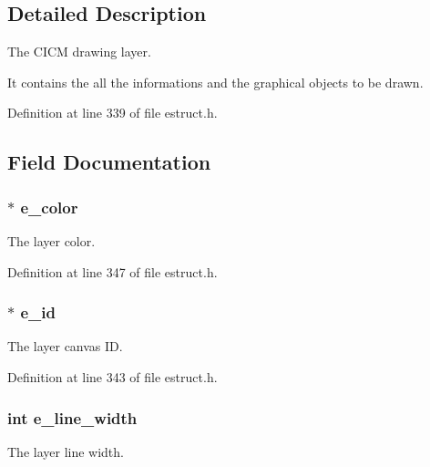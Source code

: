 \subsection{Detailed Description}
The C\-I\-C\-M drawing layer. 

It contains the all the informations and the graphical objects to be drawn. 

Definition at line 339 of file estruct.\-h.



\subsection{Field Documentation}
\hypertarget{struct__elayer_a13dfb00aea95e0dc5b9d1297260a9280}{
\subsubsection[{e\-\_\-color}]{$\ast$ e\-\_\-color}}\label{struct__elayer_a13dfb00aea95e0dc5b9d1297260a9280}
The layer color. 

Definition at line 347 of file estruct.\-h.

\hypertarget{struct__elayer_a1f5d3d53b83fa9009ede11f8a9902dff}{
\subsubsection[{e\-\_\-id}]{$\ast$ e\-\_\-id}}\label{struct__elayer_a1f5d3d53b83fa9009ede11f8a9902dff}
The layer canvas I\-D. 

Definition at line 343 of file estruct.\-h.

\hypertarget{struct__elayer_a4f088d61988de49543e814d4b5a74947}{
\subsubsection[{e\-\_\-line\-\_\-width}]{\setlength{\rightskip}{0pt plus 5cm}int e\-\_\-line\-\_\-width}}\label{struct__elayer_a4f088d61988de49543e814d4b5a74947}
The layer line width. 


